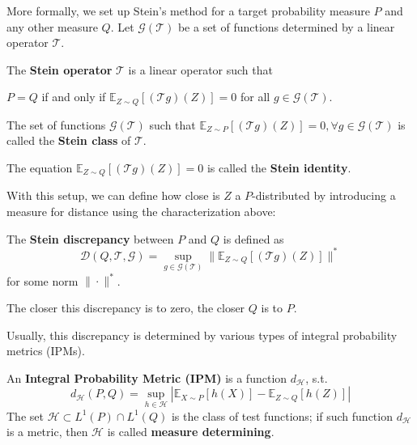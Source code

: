 \documentclass{article}
\begin{document}
More formally, we set up Stein's method for a target probability measure $P$ and any other measure $Q$. Let $\mathcal{G}(\mathcal{T})$ be a set of functions determined by a linear operator $\mathcal{T}$.  

\begin{definition}\label{def:stein_operator}
    The \textbf{Stein operator} $\mathcal{T}$ is a linear operator such that
    \begin{center}
        $P=Q$ if and only if $\mathbb{E}_{Z\sim Q}[(\mathcal{T}g)(Z)]=0$ for all $g \in \mathcal{G}(\mathcal{T})$.
    \end{center}
    The set of functions $\mathcal{G}(\mathcal{T})$ such that $\mathbb{E}_{Z \sim P}[(\mathcal{T}g)(Z)]=0, \forall g \in \mathcal{G}(\mathcal{T})$ is called the \textbf{Stein class} of $\mathcal{T}$.
\end{definition}

The equation $\mathbb{E}_{Z\sim Q}[(\mathcal{T}g)(Z)]=0$ is called the \textbf{Stein identity}.  

With this setup, we can define how close is $Z$ a $P$-distributed by introducing a measure for distance using the characterization above:

\begin{definition}
    The \textbf{Stein discrepancy} between $P$ and $Q$ is defined as\label{def:stein_discrepancy}
    \begin{equation*}
        \mathcal{D}(Q, \mathcal{T}, \mathcal{G})=\sup_{g \in \mathcal{G}(\mathcal{T})} \|\mathbb{E}_{Z\sim Q}[(\mathcal{T}g)(Z)]\|^*
    \end{equation*}
    for some norm $\|\cdot\|^*$.
\end{definition}

The closer this discrepancy is to zero, the closer $Q$ is to $P$. 

Usually, this discrepancy is determined by various types of integral probability metrics (IPMs).

\begin{definition}\label{def:ipm}
    An \textbf{Integral Probability Metric (IPM)} is a function $d_{\mathcal{H}}$, s.t. 
    \begin{equation*}
        d_\mathcal{H}(P, Q) = \sup_{h \in \mathcal{H}} |\mathbb{E}_{X\sim P}[h(X)] - \mathbb{E}_{Z\sim Q}[h(Z)]|
    \end{equation*}
    The set $\mathcal{H} \subset L^1(P) \cap L^1(Q)$ is the class of test functions; if such function $d_\mathcal{H}$ is a metric, then $\mathcal{H}$ is called \textbf{measure determining}.
\end{definition}
\end{document}
